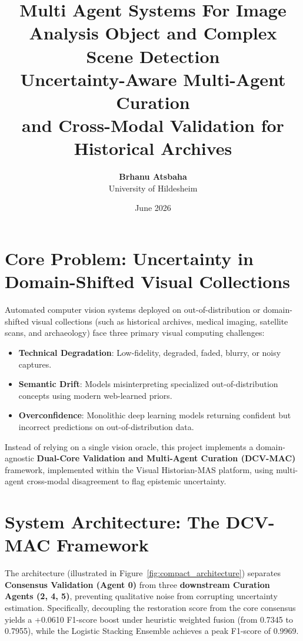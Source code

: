 \documentclass[11pt,a4paper]{article}
\title{\textbf{Multi Agent Systems For Image Analysis Object and Complex Scene Detection } \\ Uncertainty-Aware Multi-Agent Curation \\ and Cross-Modal Validation for Historical Archives}
\author{\textbf{Brhanu Atsbaha} \\ University of Hildesheim}
\date{June 2026}
\newcommand{\term}[1]{\textbf{#1}}
\begin{document}
\maketitle

\section{Core Problem: Uncertainty in Domain-Shifted Visual Collections}
Automated computer vision systems deployed on out-of-distribution or domain-shifted visual collections (such as historical archives, medical imaging, satellite scans, and archaeology) face three primary visual computing challenges:
\begin{itemize}[leftmargin=*, noitemsep]
    \item \term{Technical Degradation}: Low-fidelity, degraded, faded, blurry, or noisy captures.
    \item \term{Semantic Drift}: Models misinterpreting specialized out-of-distribution concepts using modern web-learned priors.
    \item \term{Overconfidence}: Monolithic deep learning models returning confident but incorrect predictions on out-of-distribution data.
\end{itemize}
Instead of relying on a single vision oracle, this project implements a domain-agnostic \term{Dual-Core Validation and Multi-Agent Curation (DCV-MAC)} framework, implemented within the Visual Historian-MAS platform, using multi-agent cross-modal disagreement to flag epistemic uncertainty.

\section{System Architecture: The DCV-MAC Framework}
The architecture (illustrated in Figure~\ref{fig:compact_architecture}) separates \term{Consensus Validation (Agent 0)} from three \term{downstream Curation Agents (2, 4, 5)}, preventing qualitative noise from corrupting uncertainty estimation. Specifically, decoupling the restoration score from the core consensus yields a +0.0610 F1-score boost under heuristic weighted fusion (from 0.7345 to 0.7955), while the Logistic Stacking Ensemble achieves a peak F1-score of 0.9969.
\end{document}
